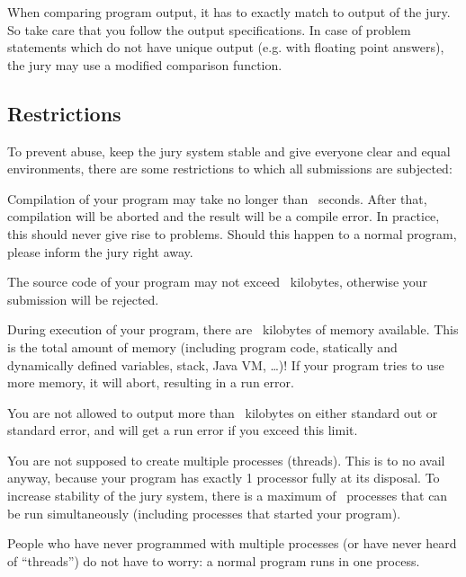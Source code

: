 When comparing program output, it has to exactly match to output of
the jury. So take care that you follow the output specifications. In
case of problem statements which do not have unique output (e.g. with
floating point answers), the jury may use a modified comparison
function.

\subsection{Restrictions}\label{runlimits}

To prevent abuse, keep the jury system stable and give everyone
clear and equal environments, there are some restrictions to which all
submissions are subjected:

\begin{description}
\item[compile time]
Compilation of your program may take no longer than \COMPILETIME\
seconds. After that, compilation will be aborted and the result will
be a compile error. In practice, this should never give rise to
problems. Should this happen to a normal program, please inform the
jury right away.

\item[source size]
The source code of your program may not exceed \SOURCESIZE\ kilobytes,
otherwise your submission will be rejected.

\item[memory]
During execution of your program, there are \MEMLIMIT\ kilobytes of
memory available. This is the total amount of memory (including
program code, statically and dynamically defined variables, stack,
Java VM, \dots)! If your program tries to use more memory, it will
abort, resulting in a run error.

\item[program output]
You are not allowed to output more than \FILELIMIT\ kilobytes 
on either standard out or standard error, and will get a run error
if you exceed this limit.

\item[number of processes]
You are not supposed to create multiple processes (threads). This is
to no avail anyway, because your program has exactly 1 processor fully
at its disposal. To increase stability of the jury system, there is a
maximum of \PROCLIMIT\ processes that can be run simultaneously
(including processes that started your program).

People who have never programmed with multiple processes (or have
never heard of ``threads'') do not have to worry: a normal program
runs in one process.

\end{description}

